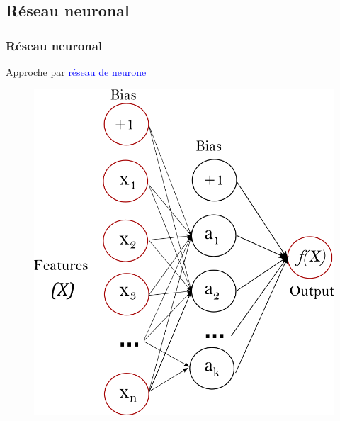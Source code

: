 \documentclass{beamer}
\begin{document}
\subsection{Réseau neuronal}
\begin{frame}
	\frametitle{Réseau neuronal}
	Approche par \textcolor{blue}{réseau de neurone}
	\begin{figure}[t]
		\centering
		\begin{minipage}{0.5\textwidth}
			\includegraphics[scale=0.2]{nn_sk}
		\end{minipage}
	\end{figure}
\end{frame}
\end{document}

